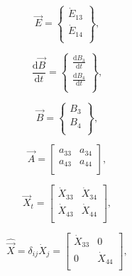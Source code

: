 \begin{equation} \label{eq:E_vec_def}
	\vec{E} =		\begin{Bmatrix} 	\dot{E}_{13}	\\
													\dot{E}_{14}\\
						\end{Bmatrix},
\end{equation}

\begin{equation} \label{eq:dBdt_vec_def}
	\frac{\mathrm{d}\vec{B}}{\mathrm{d}t} =	\begin{Bmatrix}	\frac{\mathrm{d}B_{3}}{\mathrm{d}t}	\\
																									\frac{\mathrm{d}B_{4}}{\mathrm{d}t}\\
																		\end{Bmatrix},
\end{equation}

\begin{equation} \label{eq:B_vec_def}
	\vec{B} =			\begin{Bmatrix}	B_{3}\\
														B_{4}\\
							\end{Bmatrix},
\end{equation}

\begin{equation} \label{eq:A_matrix_def}
	\vec{A} =	\begin{bmatrix} 	a_{33} & a_{34}	\\
												a_{43} & a_{44}	\\
					\end{bmatrix},
\end{equation}

\begin{equation} \label{eq:X_t_matrix_def}
	\vec{X}_{t} =		\begin{bmatrix} 	\dot{X}_{33}		&	\dot{X}_{34}	\\
														\dot{X}_{43}		&	\dot{X}_{44}\\
							\end{bmatrix},
\end{equation}

\begin{equation} \label{eq:X_hat_matrix_def}
	\hat{\vec{X}} = \delta_{ij}\dot{X}_{j} = \begin{bmatrix} 	\dot{X}_{33}		&	0					\\
																								0					&	\dot{X}_{44}	\\
																							\end{bmatrix},
\end{equation}

